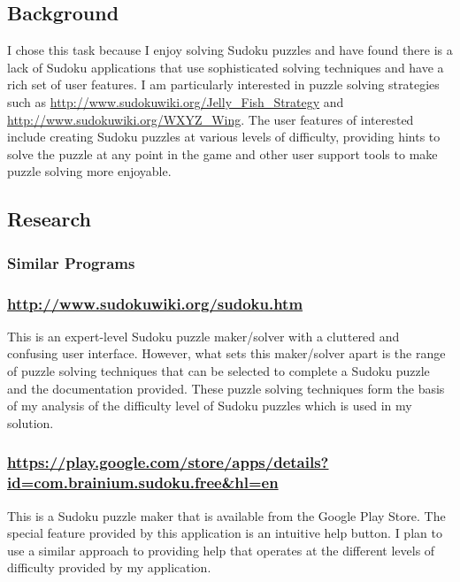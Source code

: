 \documentclass[fleqn]{article}
\begin{document}
\subsection{Background}
I chose this task because I enjoy solving Sudoku puzzles and have found there is a lack of Sudoku applications that use sophisticated solving techniques and have a rich set of user features. I am particularly interested in puzzle solving strategies such as \url{http://www.sudokuwiki.org/Jelly_Fish_Strategy} and \url{http://www.sudokuwiki.org/WXYZ_Wing}. The user features of interested include creating Sudoku puzzles at various levels of difficulty, providing hints to solve the puzzle at any point in the game and other user support tools to make puzzle solving more enjoyable.

\subsection{Research}
\subsubsection{Similar Programs}
\subsubsection*{\url{http://www.sudokuwiki.org/sudoku.htm}}
This is an expert-level Sudoku puzzle maker/solver with a cluttered and confusing user interface. However, what sets this maker/solver apart is the range of puzzle solving techniques that can be selected to complete a Sudoku puzzle and the documentation provided. These puzzle solving techniques form the basis of my analysis of the difficulty level of Sudoku puzzles which is used in my solution.

\subsubsection*{\url{https://play.google.com/store/apps/details?id=com.brainium.sudoku.free&hl=en}}
This is a Sudoku puzzle maker that is available from the Google Play Store. The special feature provided by this application is an intuitive help button. I plan to use a similar approach to providing help that operates at the different levels of difficulty provided by my application.
\end{document}
